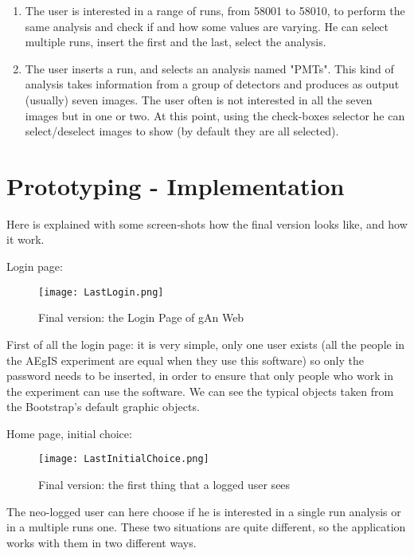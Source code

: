\begin{enumerate}
\item
The user is interested in a range of runs, from 58001 to 58010, to perform the same analysis and check if and how some values are varying. He can select multiple runs, insert the first and the last, select the analysis.

\item
The user inserts a run, and selects an analysis named "PMTs". This kind of analysis takes information from a group of detectors and produces as output (usually) seven images. The user often is not interested in all the seven images but in one or two. At this point, using the check-boxes selector he can select/deselect images to show (by default they are all selected).  

\end{enumerate}

\newpage
\section{Prototyping - Implementation}

Here is explained with some screen-shots how the final version looks like, and how it work.

Login page:


\begin{figure}[H]
\centering
\texttt{[image: LastLogin.png]} 
\caption{Final version: the Login Page of gAn Web}
\end{figure}

First of all the login page: it is very simple, only one user exists (all the people in the AEgIS experiment are equal when they use this software) so only the password needs to be inserted, in order to ensure that only people who work in the experiment can use the software. We can see the typical objects taken from the Bootstrap's default graphic objects.

\newpage

Home page, initial choice:

\begin{figure}[H]
\centering
\texttt{[image: LastInitialChoice.png]} 
\caption{Final version: the first thing that a logged user sees}
\end{figure}
  
The neo-logged user can here choose if he is interested in a single run analysis or in a multiple runs one. These two situations are quite different, so the application works with them in two different ways.

